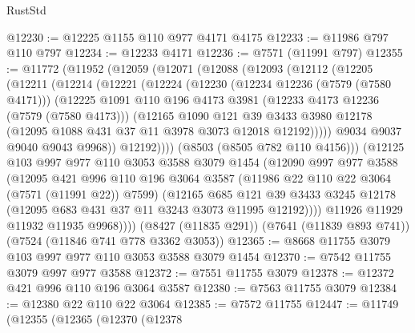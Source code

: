 \begin{lexlean}{RustStd}
\begin{coremodule}
@12230 := @12225 @1155 @110 @977 @4171 @4175
@12233 := @11986 @797 @110 @797
@12234 := @12233 @4171
@12236 := @7571 (@11991 @797)
@12355 := @11772
    (@11952
      (@12059
        (@12071
          (@12088
            (@12093
              (@12112
                (@12205
                  (@12211
                    (@12214
                      (@12221
                        (@12224
                          (@12230
                            (@12234 @12236 (@7579 (@7580 @4171)))
                            (@12225
                              @1091
                              @110
                              @196
                              @4173
                              @3981
                              (@12233 @4173 @12236 (@7579 (@7580 @4173)))
                              (@12165
                                @1090
                                @121
                                @39
                                @3433
                                @3980
                                @12178
                                (@12095 @1088 @431 @37 @11 @3978 @3073 @12018 @12192)))))
                        @9034
                        @9037
                        @9040
                        @9043
                        @9968))
                    @12192))))
            (@8503 (@8505 @782 @110 @4156)))
          (@12125
            @103
            @997
            @977
            @110
            @3053
            @3588
            @3079
            @1454
            (@12090
              @997
              @977
              @3588
              (@12095
                @421
                @996
                @110
                @196
                @3064
                @3587
                (@11986 @22 @110 @22 @3064 (@7571 (@11991 @22)) @7599)
                (@12165
                  @685
                  @121
                  @39
                  @3433
                  @3245
                  @12178
                  (@12095 @683 @431 @37 @11 @3243 @3073 @11995 @12192))))
            @11926
            @11929
            @11932
            @11935
            @9968))))
    (@8427 (@11835 @291))
    (@7641 (@11839 @893 @741))
    (@7524 (@11846 @741 @778 @3362 @3053))
@12365 := @8668 @11755 @3079 @103 @997 @977 @110 @3053 @3588 @3079 @1454
@12370 := @7542 @11755 @3079 @997 @977 @3588
@12372 := @7551 @11755 @3079
@12378 := @12372 @421 @996 @110 @196 @3064 @3587
@12380 := @7563 @11755 @3079
@12384 := @12380 @22 @110 @22 @3064
@12385 := @7572 @11755
@12447 := @11749
    (@12355
      (@12365
        (@12370
          (@12378

\end{coremodule}
\end{lexlean}
